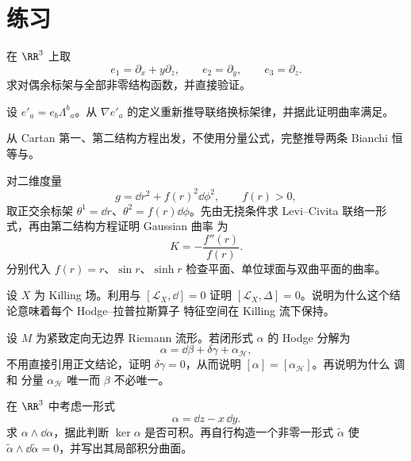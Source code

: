 \section{练习}

\begin{exercise}
在 \(\RR^3\) 上取
\[
e_1=\partial_x+y\partial_z,
\qquad
e_2=\partial_y,
\qquad
e_3=\partial_z.
\]
求对偶余标架与全部非零结构函数，并直接验证。
\end{exercise}

\begin{exercise}
设 \(e'_a=e_b\Lambda^b{}_a\)。从 \(\nabla e'_a\) 的定义重新推导联络换标架律，并据此证明曲率满足。
\end{exercise}

\begin{exercise}
从 Cartan 第一、第二结构方程出发，不使用分量公式，完整推导两条 Bianchi 恒等与。
\end{exercise}

\begin{exercise}
对二维度量
\[
g=\dd r^2+f(r)^2\dd\phi^2,
\qquad f(r)>0,
\]
取正交余标架 \(\theta^1=\dd r\)、\(\theta^2=f(r)\dd\phi\)。先由无挠条件求 Levi--Civita 联络一形式，再由第二结构方程证明 Gaussian 曲率 为
\[
K=-\frac{f''(r)}{f(r)}.
\]
分别代入 \(f(r)=r\)、\(\sin r\)、\(\sinh r\) 检查平面、单位球面与双曲平面的曲率。
\end{exercise}

\begin{exercise}
设 \(X\) 为 Killing 场。利用与 \([\mathcal L_X,\dd]=0\) 证明 \([\mathcal L_X,\Delta]=0\)。说明为什么这个结论意味着每个 Hodge--拉普拉斯算子 特征空间在 Killing 流下保持。
\end{exercise}

\begin{exercise}
设 \(M\) 为紧致定向无边界 Riemann 流形。若闭形式 \(\alpha\) 的 Hodge 分解为
\[
\alpha=\dd\beta+\delta\gamma+\alpha_{\mathcal H},
\]
不用直接引用正文结论，证明 \(\delta\gamma=0\)，从而说明 \([\alpha]=[\alpha_{\mathcal H}]\)。再说明为什么 调和 分量 \(\alpha_{\mathcal H}\) 唯一而 \(\beta\) 不必唯一。
\end{exercise}

\begin{exercise}
在 \(\RR^3\) 中考虑一形式
\[
\alpha=\dd z-x\,\dd y.
\]
求 \(\alpha\wedge\dd\alpha\)，据此判断 \(\ker\alpha\) 是否可积。再自行构造一个非零一形式 \(\widetilde\alpha\) 使 \(\widetilde\alpha\wedge\dd\widetilde\alpha=0\)，并写出其局部积分曲面。
\end{exercise}


